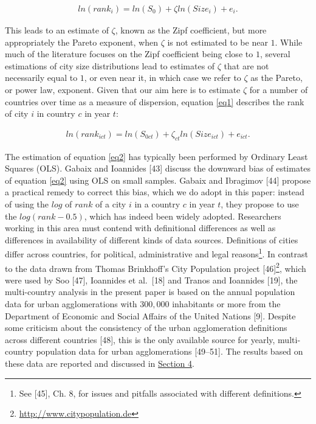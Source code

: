 \documentclass[10pt,letterpaper]{article}
\begin{document}
\begin{align}
ln(rank_{i}) = ln(S_0) + \zeta ln(Size_i) + e_{i}. \label{eq1}
\end{align}

This leads to an estimate of \(\zeta\), known as the Zipf coefficient,
but more appropriately the Pareto exponent, when \(\zeta\) is not
estimated to be near \(1\). While much of the literature focuses on the
Zipf coefficient being close to \(1\), several estimations of city size
distributions lead to estimates of \(\zeta\) that are not necessarily
equal to \(1\), or even near it, in which case we refer to \(\zeta\) as
the Pareto, or power law, exponent. Given that our aim here is to
estimate \(\zeta\) for a number of countries over time as a measure of
dispersion, equation \ref{eq1} describes the rank of city \(i\) in
country \(c\) in year \(t\):

\begin{align}
ln(rank_{ict}) = ln(S_{0ct}) + \zeta_{ct} ln(Size_{ict}) + e_{ict}. \label{eq2}
\end{align}

The estimation of equation \ref{eq2} has typically been performed by
Ordinary Least Squares (OLS). Gabaix and Ioannides {[}43{]} discuss the
downward bias of estimates of equation \ref{eq2} using OLS on small
samples. Gabaix and Ibragimov {[}44{]} propose a practical remedy to
correct this bias, which we do adopt in this paper: instead of using the
\(log\) of \(rank\) of a city \(i\) in a country \(c\) in year \(t\),
they propose to use the \(log(rank-0.5)\), which has indeed been widely
adopted. Researchers working in this area must contend with definitional
differences as well as differences in availability of different kinds of
data sources. Definitions of cities differ across countries, for
political, administrative and legal reasons\footnote{See {[}45{]}, Ch.
  8, for issues and pitfalls associated with different definitions.}. In
contrast to the data drawn from Thomas Brinkhoff's City Population
project {[}46{]}\footnote{\url{http://www.citypopulation.de}}, which
were used by Soo {[}47{]}, Ioannides et al.~{[}18{]} and Tranos and
Ioannides {[}19{]}, the multi-country analysis in the present paper is
based on the annual population data for urban agglomerations with
\(300,000\) inhabitants or more from the Department of Economic and
Social Affairs of the United Nations {[}9{]}. Despite some criticism
about the consistency of the urban agglomeration definitions across
different countries {[}48{]}, this is the only available source for
yearly, multi-country population data for urban agglomerations
{[}49--51{]}. The results based on these data are reported and discussed
in \protect\hyperlink{sec4}{Section 4}.
\end{document}
